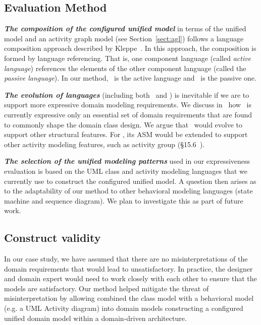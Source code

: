\subsection{Evaluation Method}
%

\textbf{\textit{The composition of the configured unified model}} in terms of the unified model and an activity graph model (see Section~\ref{sect:agl}) follows a language composition approach described by Kleppe~\cite{kleppe_software_2008}. In this approach, the composition is formed by language referencing. That is, one component language (called \textit{active language}) references the elements of the other component language (called the \textit{passive language}). In our method, \agl~is the active language and \dcsl~is the passive one.

\textbf{\textit{The evolution of languages}} (including both \agl~and \dcsl) is inevitable if we are to support 
more expressive domain modeling requirements. We discuss in~\cite{le_domain_2018} how \dcsl~is currently expressive only \wrt an essential set of domain requirements that are found to commonly shape the domain class design. We argue that \dcsl~would evolve to support other structural features. For \agl, its ASM would be extended to support other activity modeling features, such as activity group (\S{15.6}~\cite{omg_unified_2015}).

\textbf{\textit{The selection of the unified modeling patterns}} used in our expressiveness evaluation is based on the UML class and activity modeling languages that we currently use to construct the configured unified model. A question then arises as to the adaptability of our method to other behavioral modeling languages (\eg state machine and sequence diagram). We plan to investigate this as part of future work.
%
\subsection{Construct validity}
In our case study, we have assumed that there are no misinterpretations of the domain requirements that would lead to unsatisfactory. In practice, the designer and domain expert would need to work closely with each other to ensure that the models are satisfactory.
Our method helped mitigate the threat of misinterpretation by allowing combined the class model with a behavioral model (e.g. a UML Activity
diagram) into domain models constructing a configured unified domain model within a domain-driven architecture.
%
